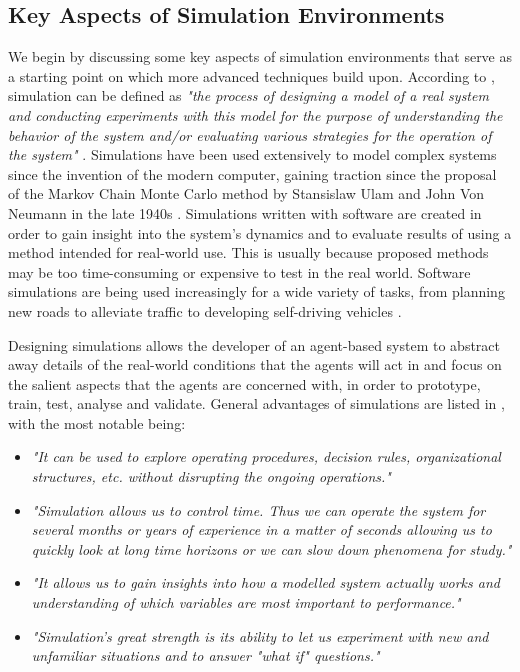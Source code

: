 \subsection{Key Aspects of Simulation Environments}
We begin by discussing some key aspects of simulation environments that serve as a starting point on which more advanced techniques build upon. According to %
\citeauthor{Shannon1998INTRODUCTIONSIMULATION}, simulation can be defined as \textit{"the process of designing a model of a real system and conducting experiments with this model for the purpose of understanding the behavior of the system and/or evaluating various strategies for the operation of the system"} \cite{Shannon1998INTRODUCTIONSIMULATION}. Simulations have been used extensively to model complex systems since the invention of the modern computer, gaining traction since the proposal of the Markov Chain Monte Carlo method by Stansislaw Ulam and John Von Neumann in the late 1940s \cite{Robert2011AIncomplete}. Simulations written with software are created in order to gain insight into the system's dynamics and to evaluate results of using a method intended for real-world use. This is usually because proposed methods may be too time-consuming or expensive to test in the real world. Software simulations are being used increasingly for a wide variety of tasks, from planning new roads to alleviate traffic \cite{Pell2017TrendsSimulation} to developing self-driving vehicles \cite{Dosovitskiy2017CARLA:Simulator}. 

Designing simulations allows the developer of an agent-based system to abstract away details of the real-world conditions that the agents will act in and focus on the salient aspects that the agents are concerned with, in order to prototype, train, test, analyse and validate. General advantages of simulations are listed in  \cite{Shannon1998INTRODUCTIONSIMULATION}, with the most notable being:
\begin{itemize}
    \item \textit{"It can be used to explore operating procedures, decision rules, organizational structures, etc. without disrupting the ongoing operations."}
    \item \textit{"Simulation allows us to control time. Thus we can operate the system for several months or years of experience in a matter of seconds allowing us to quickly look at long time horizons or we can slow down phenomena for study."}
    \item \textit{"It allows us to gain insights into how a modelled system actually works and understanding of which variables are most important to performance."}
    \item \textit{"Simulation's great strength is its ability to let us experiment with new and unfamiliar situations and to answer "what if" questions."}
\end{itemize}



